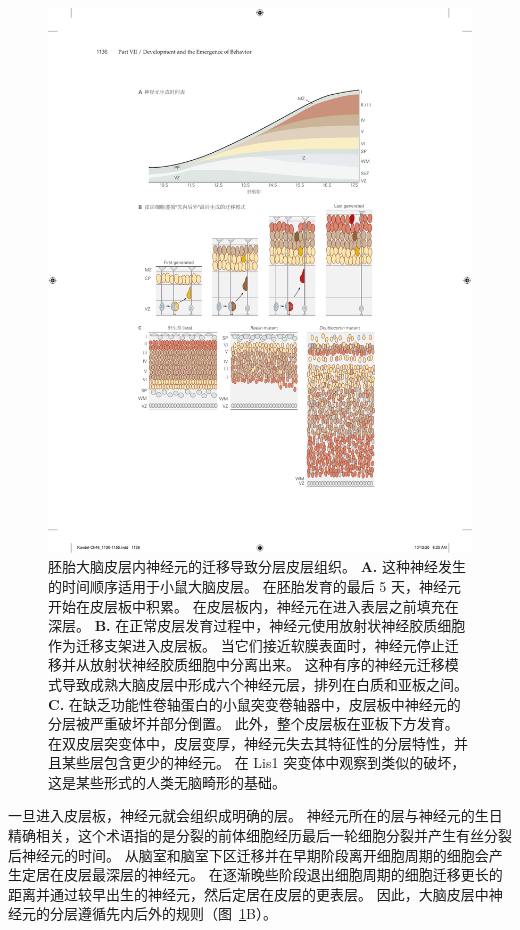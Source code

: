 \begin{figure}[htbp]
	\centering
	\includegraphics[width=0.8\linewidth]{chap46/fig_46_5}
	\caption{胚胎大脑皮层内神经元的迁移导致分层皮层组织\cite{olson2002smooth}。
		\textbf{A.} 这种神经发生的时间顺序适用于小鼠大脑皮层。
		在胚胎发育的最后 5 天，神经元开始在皮层板中积累。
		在皮层板内，神经元在进入表层之前填充在深层。 
		\textbf{B.} 在正常皮层发育过程中，神经元使用放射状神经胶质细胞作为迁移支架进入皮层板。
		当它们接近软膜表面时，神经元停止迁移并从放射状神经胶质细胞中分离出来。
		这种有序的神经元迁移模式导致成熟大脑皮层中形成六个神经元层，排列在白质和亚板之间。
		\textbf{C.} 在缺乏功能性卷轴蛋白的小鼠突变卷轴器中，皮层板中神经元的分层被严重破坏并部分倒置。
		此外，整个皮层板在亚板下方发育。
		在双皮层突变体中，皮层变厚，神经元失去其特征性的分层特性，并且某些层包含更少的神经元。
		在 Lis1 突变体中观察到类似的破坏，这是某些形式的人类无脑畸形的基础。}
	\label{fig:46_5}
\end{figure}


一旦进入皮层板，神经元就会组织成明确的层。
神经元所在的层与神经元的生日精确相关，这个术语指的是分裂的前体细胞经历最后一轮细胞分裂并产生有丝分裂后神经元的时间。
从脑室和脑室下区迁移并在早期阶段离开细胞周期的细胞会产生定居在皮层最深层的神经元。
在逐渐晚些阶段退出细胞周期的细胞迁移更长的距离并通过较早出生的神经元，然后定居在皮层的更表层。
因此，大脑皮层中神经元的分层遵循先内后外的规则（图~\ref{fig:46_5}B）。



